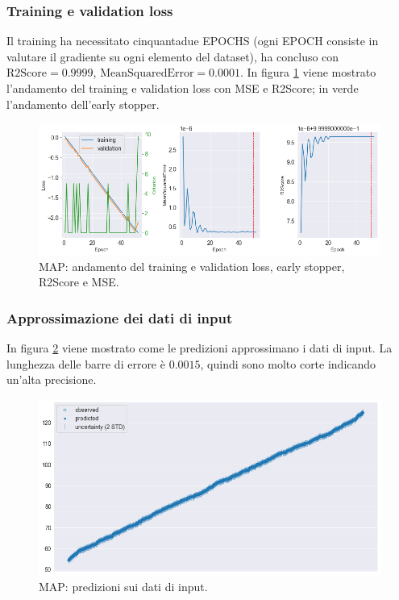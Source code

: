 \subsubsection{Training e validation loss}
Il training ha necessitato cinquantadue EPOCHS (ogni EPOCH consiste in valutare il gradiente su ogni elemento del dataset), ha concluso con $\text{R2Score}=0.9999$, $\text{MeanSquaredError}=0.0001$. In figura \ref{MAP - loss} viene mostrato l'andamento del training e validation loss con MSE e R2Score; in verde l'andamento dell'early stopper.
\begin{figure}[h]
    \centering
    \includegraphics[width=1\textwidth]{images/Training (risultati)/MAP/MAP - loss.png}
    \caption{MAP: andamento del training e validation loss, early stopper, R2Score e MSE.}
    \label{MAP - loss}
\end{figure}

\newpage



\subsubsection{Approssimazione dei dati di input}
In figura \ref{MAP - inference} viene mostrato come le predizioni approssimano i dati di input. La lunghezza delle barre di errore è $0.0015$, quindi sono molto corte indicando un'alta precisione.

\begin{figure}[!htb]
    \centering
    \includegraphics[width=1\textwidth]{images/Training (risultati)/MAP/MAP - inference.png}
    \caption{MAP: predizioni sui dati di input.}
    \label{MAP - inference}
\end{figure}



